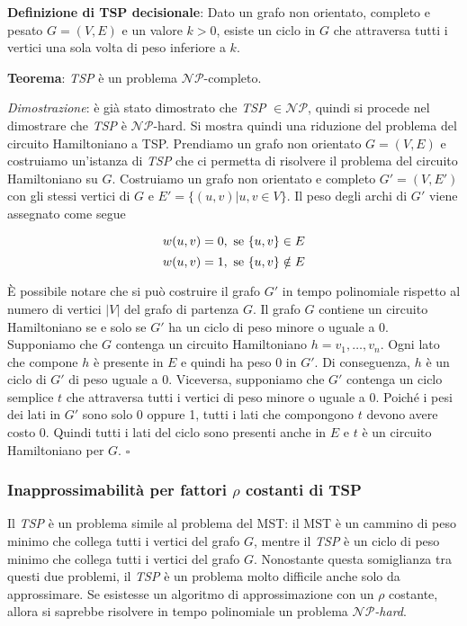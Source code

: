 \textbf{Definizione di TSP decisionale}: Dato un grafo non orientato, completo e pesato
$G = (V,E)$ e un valore $k > 0$, esiste un ciclo in $G$ che attraversa tutti i vertici una
sola volta di peso inferiore a $k$.

\textbf{Teorema}: \textit{TSP} è un problema $\mathcal{NP}$-completo.

\textit{Dimostrazione}: è già stato dimostrato che \textit{TSP} $\in \mathcal{NP}$, quindi si procede nel dimostrare
che \textit{TSP} è $\mathcal{NP}$-hard. Si mostra quindi una riduzione del problema del circuito Hamiltoniano a TSP.
Prendiamo un grafo non orientato $G = (V,E)$ e costruiamo un'istanza di \textit{TSP} che ci permetta di risolvere
il problema del circuito Hamiltoniano su $G$. Costruiamo un grafo non orientato e completo $G' = (V, E')$
con gli stessi vertici di $G$ e $E' = \{(u, v) | u, v \in V\}$. Il peso degli archi di $G'$ viene assegnato
come segue

\[
    w(u, v) = 0, \textnormal{ se } \{u, v\} \in E
\]
\[
    w(u, v) = 1, \textnormal{ se } \{u, v\} \notin E
\]

È possibile notare che si può costruire il grafo $G'$ in tempo polinomiale rispetto al numero
di vertici $|V|$ del grafo di partenza $G$. Il grafo $G$ contiene un circuito Hamiltoniano se e
solo se $G'$ ha un ciclo di peso minore o uguale a 0. Supponiamo che $G$ contenga un circuito
Hamiltoniano $h = v_1, \dots, v_n$. Ogni lato che compone $h$ è presente in $E$ e quindi ha peso 0 in $G'$.
Di conseguenza, $h$ è un ciclo di $G'$ di peso uguale a 0. Viceversa, supponiamo che $G'$ contenga un ciclo
semplice $t$ che attraversa tutti i vertici di peso minore o uguale a 0. Poiché i pesi dei lati
in $G'$ sono solo 0 oppure 1, tutti i lati che compongono $t$ devono avere costo 0. Quindi tutti i
lati del ciclo sono presenti anche in $E$ e $t$ è un circuito Hamiltoniano per $G$. $ \square $

\subsubsection{Inapprossimabilità per fattori $\rho$ costanti di TSP}

Il \textit{TSP} è un problema simile al problema del MST: il MST è un cammino di peso minimo
che collega tutti i vertici del grafo $G$, mentre il \textit{TSP} è un ciclo di peso minimo
che collega tutti i vertici del grafo $G$. Nonostante questa somiglianza tra questi
due problemi, il \textit{TSP} è un problema molto difficile anche solo da approssimare. Se
esistesse un algoritmo di approssimazione con un $\rho$ costante, allora si saprebbe
risolvere in tempo polinomiale un problema \textit{$\mathcal{NP}$-hard}.

